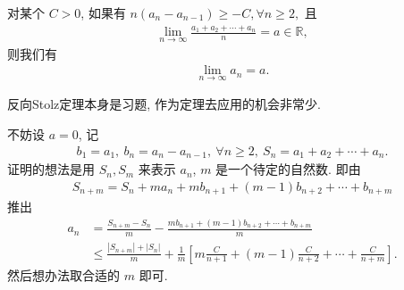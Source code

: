 \documentclass[../../main.tex]{subfiles}%
\begin{document}
\begin{theorem}\label{theorem:反向Stolz定理}
对某个 $C > 0$, 如果有 $n(a_n - a_{n-1}) \geqslant -C, \forall n \geqslant 2,$ 且
\begin{align*}
\lim_{n \to \infty} \frac{a_1 + a_2 + \cdots + a_n}{n} = a \in \mathbb{R},
\end{align*}
则我们有
\begin{align*}
\lim_{n \to \infty} a_n = a.
\end{align*}
\end{theorem}
\begin{note}
反向Stolz定理本身是习题, 作为定理去应用的机会非常少.
\end{note}
\begin{note}
不妨设 $a = 0$, 记
\begin{align*}
b_1 = a_1,\ b_n = a_n - a_{n-1},\ \forall n \geqslant 2,\ S_n = a_1 + a_2 + \cdots + a_n.
\end{align*}
证明的想法是用 $S_n, S_m$ 来表示 $a_n$, $m$ 是一个待定的自然数. 即由
\begin{align*}
S_{n+m} = S_n + m a_n + m b_{n+1} + (m - 1) b_{n+2} + \cdots + b_{n+m}
\end{align*}
推出
\begin{align*}
a_n &= \frac{S_{n+m} - S_n}{m} - \frac{m b_{n+1} + (m - 1) b_{n+2} + \cdots + b_{n+m}}{m} \\
&\leqslant \frac{|S_{n+m}| + |S_n|}{m} + \frac{1}{m} \left[ m \frac{C}{n + 1} + (m - 1) \frac{C}{n + 2} + \cdots + \frac{C}{n + m} \right].
\end{align*}
然后想办法取合适的 $m$ 即可.
\end{note}
\end{document}
